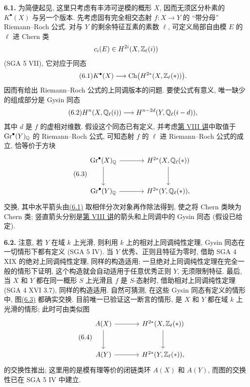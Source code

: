 \noindent{}\textbf{6.1.}
为简便起见, 这里只考虑有丰沛可逆模的概形 $X$, 因而无须区分朴素的 $K^\bullet(X)$ 与另一个版本. 先考虑固有完全相交态射 $f:X\longrightarrow Y$ 的 ``带分母'' Riemann--Roch 公式. 对与 $Y$ 的剩余特征互素的素数 $\ell$, 可定义局部自由模 $E$ 的 $\ell$ 进 Chern 类
\[
 c_i(E)\in H^{2i}(X,\mathbb Z_\ell(i))
\]
(SGA 5 VII), 它对应于同态
\begin{equation}\tag{6.1}
 K^\bullet(X)\longrightarrow \operatorname{Ch}\bigl(H^{2*}(X,\mathbb Z_\ell(*))\bigr).
\end{equation}
因而有给出 Riemann--Roch 公式的上同调版本的问题. 要使公式有意义, 唯一缺少的组成部分是 Gysin 同态
\begin{equation}\tag{6.2}
 H^n(X,\mathbb Q_\ell(i))\longrightarrow H^{n-2d}(Y,\mathbb Q_\ell(i-d)),
\end{equation}
其中 $d$ 是 $f$ 的虚相对维数. 假设这个同态已有定义, 并考虑\hyperlink{sga6.e08.expose}{第 VIII 讲}中取值于 $\operatorname{Gr}^\bullet(Y)_{\mathbb Q}$ 的 Riemann--Roch 公式, 可知态射 $f$ 的 $\ell$ 进 Riemann--Roch 公式的成立, 恰等价于方块
\begin{equation}\tag{6.3}
\begin{tikzcd}[column sep=large,row sep=large]
 \operatorname{Gr}^\bullet(X)_{\Q} \arrow[r] \arrow[d]
   & H^{2*}(X,\Qell(*)) \arrow[d] \\
 \operatorname{Gr}^\bullet(Y)_{\Q} \arrow[r]
   & H^{2*}(Y,\Qell(*)),
\end{tikzcd}
\end{equation}
交换, 其中水平箭头由\hyperlink{sga6.e14.eq.6-1}{(6.1)} 取相伴分次对象再作除法得到, 使之将 Chern 类映为 Chern 类; 竖直箭头分别是\hyperlink{sga6.e08.expose}{第 VIII 讲}的箭头和上同调中的 Gysin 同态 (假设已给定).

\noindent{}\textbf{6.2.}
注意, 若 $Y$ 在域 $k$ 上光滑, 则利用 $k$ 上的相对上同调纯性定理, Gysin 同态在一切情形下都有定义 (SGA 5 IV). 当 $Y$ 优秀、正则且特征为零时, 借助 SGA 4 XIX 的绝对上同调纯性定理, 同样的构造适用; 一旦绝对上同调纯性定理在完全一般的情形下证明, 这个构造就会自动适用于任意优秀正则 $Y$, 无须限制特征. 最后, 当 $X$ 和 $Y$ 都在同一概形 $S$ 上光滑且 $f$ 是 $S$-态射时, 借助相对上同调纯性定理 (SGA 4 XVI 3.7), 同样的构造适用. 自然可猜测, 在这些 Gysin 同态有定义的情形中, 图\hyperlink{sga6.e14.eq.6-3}{(6.3)} 都确实交换. 目前唯一已验证这一断言的情形, 是 $X$ 和 $Y$ 都在域 $k$ 上光滑的情形; 此时可由类似图
\begin{equation}\tag{6.4}
\begin{tikzcd}[column sep=large,row sep=large]
 A(X) \arrow[r] \arrow[d]
   & H^{2*}(X,\Zell(*)) \arrow[d] \\
 A(Y) \arrow[r]
   & H^{2*}(Y,\Zell(*)),
\end{tikzcd}
\end{equation}
的交换性推出; 这里用的是模有理等价的闭链类环 $A(X)$ 和 $A(Y)$, 而图的交换性已在 SGA 5 IV 中建立.

